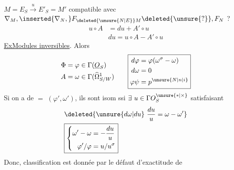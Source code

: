 $M=E_S\xrightarrow{u}E'_S=M'$ compatible avec
$\nabla_M,\inserted{\nabla_N,}F_{\deleted{\unsure{N|E}}M}\deleted{\unsure{?}},F_N$ ?
\[
\begin{aligned}
u\circ A&=du+A'\circ u\\
&\boxed{du=u\circ A-A'\circ u}
\end{aligned}
\]
\uline{Ex}\qquad \uline{Modules inversibles}. Alors
\[
\begin{aligned}
\Phi&=\varphi\in\Gamma(\underline O_S)\\
A&=\omega\in\Gamma(\widehat\Omega^1_{S/W})
\end{aligned}
\qquad
\boxed{\begin{aligned}
d\varphi&=\varphi(\omega^\sigma-\omega)\\
d\omega&=0\\
\varphi\psi&=p^{\unsure{N|n|i}}
\end{aligned}}
\]
Si on a de $=$ $(\varphi',\omega')$, ils sont isom ssi $\exists\ u\in\Gamma O_S^{\unsure{*|\times}}$ satisfaisant
\[
\begin{aligned}
&\deleted{\unsure{d\omega|du}\ \frac{du}{u}=\omega-\omega'}\\
&\boxed{\left\{\begin{aligned}
\omega'-\omega&=-\frac{du}{u}\\
\varphi'/\varphi&=u/u^\sigma
\end{aligned}\right.}
\end{aligned}
\]
Donc, classification est donnée par le défaut d'exactitude de
